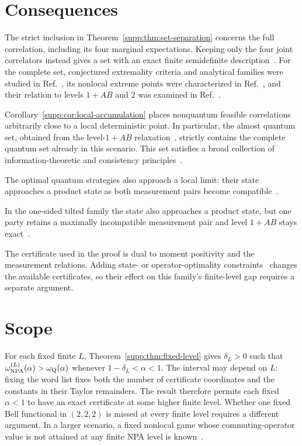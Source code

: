 \documentclass[aps,prl,onecolumn,10pt,superscriptaddress,nofootinbib,longbibliography]{revtex4-2}
\theoremstyle{remark}
\begin{document}
\section{Consequences}
\label{supp:sec:consequences}

The strict inclusion in Theorem~\ref{supp:thm:set-separation} concerns the full correlation, including its four marginal expectations. Keeping only the four joint correlators instead gives a set with an exact finite semidefinite description~\cite{Landau1988,LeEtAl2023}. For the complete set, conjectured extremality criteria and analytical families were studied in Ref.~\cite{MikosKaniewski2023}, its nonlocal extreme points were characterized in Ref.~\cite{BarizienBancal2025}, and their relation to levels $1+AB$ and $2$ was examined in Ref.~\cite{Ishizaka2025}.

Corollary~\ref{supp:cor:local-accumulation} places nonquantum feasible correlations arbitrarily close to a local deterministic point. In particular, the almost quantum set, obtained from the level-$1+AB$ relaxation~\cite{NGHA2015}, strictly contains the complete quantum set already in this scenario. This set satisfies a broad collection of information-theoretic and consistency principles~\cite{NGHA2015}.

The optimal quantum strategies also approach a local limit: their state approaches a product state as both measurement pairs become compatible~\cite{GigenaEtAl2025}.

In the one-sided tilted family the state also approaches a product state, but one party retains a maximally incompatible measurement pair and level $1+AB$ stays exact~\cite{BampsPironio2015,GigenaEtAl2025}.

The certificate used in the proof is dual to moment positivity and the measurement relations. Adding state- or operator-optimality constraints~\cite{AraujoEtAl2026} changes the available certificates, so their effect on this family's finite-level gap requires a separate argument.

\section{Scope}
\label{supp:sec:scope}

For each fixed finite $L$, Theorem~\ref{supp:thm:fixed-level} gives $\delta_L>0$ such that $\omega_{\rm NPA}^{(L)}(\alpha)>\omega_{\rm Q}(\alpha)$ whenever $1-\delta_L<\alpha<1$. The interval may depend on $L$: fixing the word list fixes both the number of certificate coordinates and the constants in their Taylor remainders. The result therefore permits each fixed $\alpha<1$ to have an exact certificate at some higher finite level. Whether one fixed Bell functional in $(2,2,2)$ is missed at every finite level requires a different argument. In a larger scenario, a fixed nonlocal game whose commuting-operator value is not attained at any finite NPA level is known~\cite{FanizzaEtAl2025}.
\end{document}
